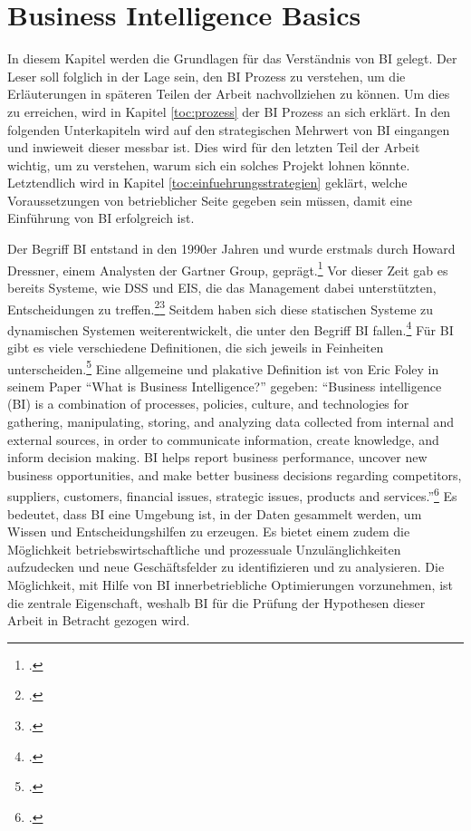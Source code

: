 \newpage
\section{Business Intelligence Basics} \label{toc:grundlagenbusinessintelligence}

In diesem Kapitel werden die Grundlagen für das Verständnis von \ac{BI} gelegt. Der Leser soll folglich in der Lage sein, den
\ac{BI} Prozess zu verstehen, um die Erläuterungen in späteren Teilen der Arbeit nachvollziehen zu können. Um dies zu erreichen,
wird in Kapitel \ref{toc:prozess} der \ac{BI} Prozess an sich erklärt. In den folgenden Unterkapiteln wird auf den
strategischen Mehrwert von \ac{BI} eingangen und inwieweit dieser messbar ist. Dies wird für den letzten Teil der Arbeit wichtig,
um zu verstehen, warum sich ein solches Projekt lohnen könnte. Letztendlich wird in Kapitel \ref{toc:einfuehrungsstrategien}
geklärt, welche Voraussetzungen von betrieblicher Seite gegeben sein müssen, damit eine Einführung von BI erfolgreich ist.

Der Begriff \ac{BI} entstand in den 1990er Jahren und wurde erstmals durch Howard Dressner, einem Analysten der Gartner Group,
geprägt.\footcite[Cf.][p. 96]{watson2007current} Vor dieser Zeit gab es bereits Systeme, wie \ac{DSS} und \ac{EIS}, die das
Management dabei unterstützten, Entscheidungen zu treffen.\footcite[Cf.][p. 1]{foley2010business}\footcite[Cf.][p. 19]{niu2009cognition}
Seitdem haben sich diese statischen Systeme zu dynamischen Systemen weiterentwickelt, die unter den Begriff \ac{BI}
fallen.\footcite[Cf.][p. 26]{yeoh2010critical} Für \ac{BI} gibt es viele verschiedene Definitionen, die sich jeweils in Feinheiten
unterscheiden.\footcite[Cf.][p. 114]{muntean2013agile} Eine allgemeine und plakative Definition ist von Eric Foley in seinem Paper
"`What is Business Intelligence?"' gegeben: "`Business intelligence (BI) is a combination of processes, policies, culture, and
technologies for gathering, manipulating, storing, and analyzing data collected from internal and external sources, in order
to communicate information, create knowledge, and inform decision making. BI helps report business performance, uncover new
business opportunities, and make better business decisions regarding competitors, suppliers, customers, financial issues,
strategic issues, products and services."'\footcite[][p. 4]{foley2010business} Es bedeutet, dass \ac{BI} eine Umgebung ist,
in der Daten gesammelt werden, um Wissen und Entscheidungshilfen zu erzeugen. Es bietet einem zudem die Möglichkeit
betriebswirtschaftliche und prozessuale Unzulänglichkeiten aufzudecken und neue Geschäftsfelder zu identifizieren und
zu analysieren. Die Möglichkeit, mit Hilfe von \ac{BI} innerbetriebliche Optimierungen vorzunehmen, ist die zentrale
Eigenschaft, weshalb \ac{BI} für die Prüfung der Hypothesen dieser Arbeit in Betracht gezogen wird.

